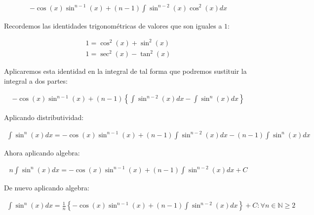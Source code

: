 \begin{equation*}
    \begin{gathered}
        -\cos(x)\sin^{n-1}(x) + (n-1)\int \sin^{n-2}(x)\cos^{2}(x)dx
    \end{gathered}
\end{equation*}

Recordemos las identidades trigonométricas de valores que son iguales a \(\displaystyle 1\):

\begin{equation*}
    \begin{gathered}
        1=\cos^2(x)+\sin^{2}(x)\\
        1=\sec^{2}(x)-\tan^{2}(x)
    \end{gathered}
\end{equation*}

Aplicaremos esta identidad en la integral de tal forma que podremos sustituir la integral a dos partes:

\begin{equation*}
    \begin{gathered}
        -\cos(x)\sin^{n-1}(x) + (n-1)\left\{\int \sin^{n-2}(x)dx -\int\sin^{n}(x)dx\right\}
    \end{gathered}
\end{equation*}

Aplicando distributividad:

\begin{equation*}
    \begin{gathered}
        \int\sin^{n}(x)dx=-\cos(x)\sin^{n-1}(x) + (n-1)\int \sin^{n-2}(x)dx -(n-1)\int\sin^{n}(x)dx
    \end{gathered}
\end{equation*}

Ahora aplicando algebra:

\begin{equation*}
    \begin{gathered}
        n\int\sin^{n}(x)dx=-\cos(x)\sin^{n-1}(x) + (n-1)\int \sin^{n-2}(x)dx + C
    \end{gathered}
\end{equation*}

De nuevo aplicando algebra:

\begin{equation*}
    \begin{gathered}
        \int\sin^{n}(x)dx=\frac{1}{n}\left\{-\cos(x)\sin^{n-1}(x) + (n-1)\int \sin^{n-2}(x)dx\right\} + C \colon \forall n\in\mathbb{N}\geq 2
    \end{gathered}
\end{equation*}

